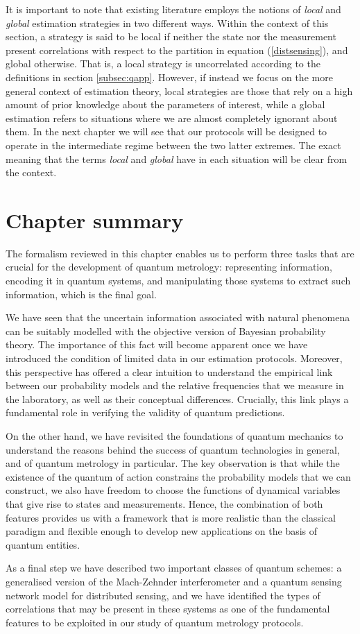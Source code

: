It is important to note that existing literature employs the notions of \emph{local} and \emph{global} estimation strategies in two different ways. Within the context of this section, a strategy is said to be local if neither the state nor the measurement present correlations with respect to the partition in equation (\ref{distsensing}), and global otherwise. That is, a local strategy is uncorrelated according to the definitions in section \ref{subsec:qapp}. However, if instead we focus on the more general context of estimation theory, local strategies are those that rely on a high amount of prior knowledge about the parameters of interest, while a global estimation refers to situations where we are almost completely ignorant about them. In the next chapter we will see that our protocols will be designed to operate in the intermediate regime between the two latter extremes. The exact meaning that the terms \emph{local} and \emph{global} have in each situation will be clear from the context.   

\section{Chapter summary}

The formalism reviewed in this chapter enables us to perform three tasks that are crucial for the development of quantum metrology: representing information, encoding it in quantum systems, and manipulating those systems to extract such information, which is the final goal.

We have seen that the uncertain information associated with natural phenomena can be suitably modelled with the objective version of Bayesian probability theory. The importance of this fact will become apparent once we have introduced the condition of limited data in our estimation protocols. Moreover, this perspective has offered a clear intuition to understand the empirical link between our probability models and the relative frequencies that we measure in the laboratory, as well as their conceptual differences. Crucially, this link plays a fundamental role in verifying the validity of quantum predictions.

On the other hand, we have revisited the foundations of quantum mechanics to understand the reasons behind the success of quantum technologies in general, and of quantum metrology in particular. The key observation is that while the existence of the quantum of action constrains the probability models that we can construct, we also have freedom to choose the functions of dynamical variables that give rise to states and measurements. Hence, the combination of both features provides us with a framework that is more realistic than the classical paradigm and flexible enough to develop new applications on the basis of quantum entities.

As a final step we have described two important classes of quantum schemes: a generalised version of the Mach-Zehnder interferometer and a quantum sensing network model for distributed sensing, and we have identified the types of correlations that may be present in these systems as one of the fundamental features to be exploited in our study of quantum metrology protocols. 